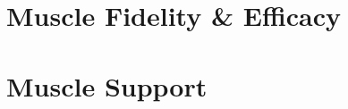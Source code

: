 

\setcounter{tocdepth}{1}
\setcounter{minitocdepth}{1} 

    \dominitoc%
    \adjustmtc[2]%
    \tableofcontents
    \label{toc-contents}

\listoffigures
	




%
%






\part{Muscle Fidelity \& Efficacy}







\part{Muscle Support}







